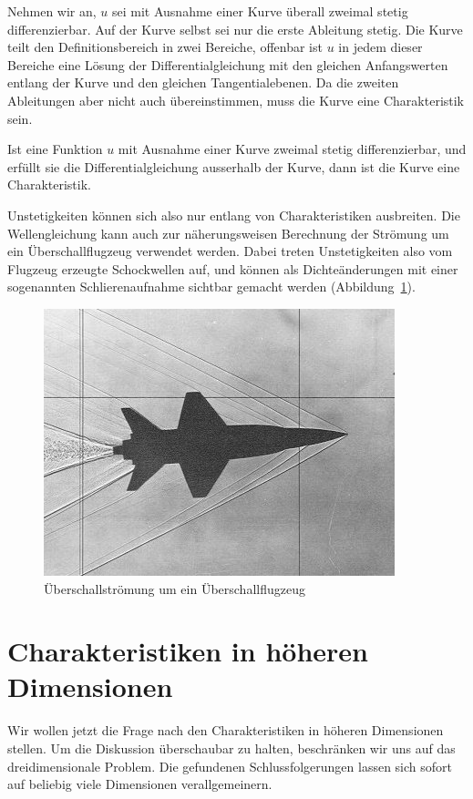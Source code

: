 Nehmen wir an, $u$ sei mit Ausnahme einer Kurve überall zweimal
stetig differenzierbar.
Auf der Kurve selbst sei nur die erste Ableitung stetig.
Die Kurve teilt den Definitionsbereich in zwei
Bereiche, offenbar ist $u$ in jedem dieser Bereiche eine 
Lösung der Differentialgleichung mit den gleichen Anfangswerten
entlang der Kurve und den gleichen Tangentialebenen.
Da die zweiten Ableitungen aber nicht auch übereinstimmen, muss
die Kurve eine Charakteristik sein.



\begin{satz}
Ist eine Funktion $u$ mit Ausnahme einer Kurve zweimal stetig
differenzierbar, und erfüllt sie die Differentialgleichung
ausserhalb der Kurve, dann ist die Kurve eine Charakteristik.
\end{satz}
Unstetigkeiten können sich also nur entlang von Charakteristiken
ausbreiten.
Die Wellengleichung kann auch zur näherungsweisen
Berechnung der Strömung um ein Überschallflugzeug verwendet werden.
Dabei treten Unstetigkeiten also vom Flugzeug erzeugte Schockwellen
auf, und können als Dichteänderungen mit einer
sogenannten Schlierenaufnahme sichtbar gemacht werden
(Abbildung~\ref{ueberschall2d}).

\begin{figure}
\begin{center}
\includegraphics[width=0.8\hsize]{graphics/i-5-1}
\end{center}
\caption{Überschallströmung um ein Überschallflugzeug\label{ueberschall2d}}
\end{figure}

\section{Charakteristiken in höheren Dimensionen}
Wir wollen jetzt die Frage nach den Charakteristiken in höheren Dimensionen
stellen. Um die Diskussion überschaubar zu halten, beschränken wir uns auf
das dreidimensionale Problem. Die gefundenen Schlussfolgerungen 
lassen sich sofort auf beliebig viele Dimensionen verallgemeinern.

